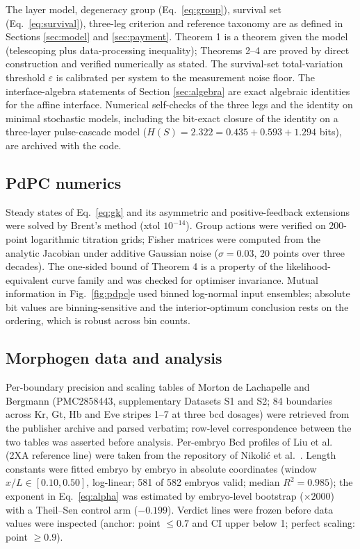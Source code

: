 \documentclass[11pt,a4paper]{article}
\begin{document}
The layer model, degeneracy group (Eq.~\ref{eq:group}), survival set (Eq.~\ref{eq:survival}), three-leg criterion and reference taxonomy are as defined in Sections \ref{sec:model} and \ref{sec:payment}. Theorem 1 is a theorem given the model (telescoping plus data-processing inequality); Theorems 2--4 are proved by direct construction and verified numerically as stated. The survival-set total-variation threshold $\varepsilon$ is calibrated per system to the measurement noise floor. The interface-algebra statements of Section \ref{sec:algebra} are exact algebraic identities for the affine interface. Numerical self-checks of the three legs and the identity on minimal stochastic models, including the bit-exact closure of the identity on a three-layer pulse-cascade model ($H(S)=2.322=0.435+0.593+1.294$ bits), are archived with the code.

\subsection{PdPC numerics}

Steady states of Eq.~\ref{eq:gk} and its asymmetric and positive-feedback extensions were solved by Brent's method (xtol $10^{-14}$). Group actions were verified on 200-point logarithmic titration grids; Fisher matrices were computed from the analytic Jacobian under additive Gaussian noise ($\sigma=0.03$, 20 points over three decades). The one-sided bound of Theorem 4 is a property of the likelihood-equivalent curve family and was checked for optimiser invariance. Mutual information in Fig.~\ref{fig:pdpc}e used binned log-normal input ensembles; absolute bit values are binning-sensitive and the interior-optimum conclusion rests on the ordering, which is robust across bin counts.

\subsection{Morphogen data and analysis}

Per-boundary precision and scaling tables of Morton de Lachapelle and Bergmann \cite{Bergmann2010} (PMC2858443, supplementary Datasets S1 and S2; 84 boundaries across Kr, Gt, Hb and Eve stripes 1--7 at three bcd dosages) were retrieved from the publisher archive and parsed verbatim; row-level correspondence between the two tables was asserted before analysis. Per-embryo Bcd profiles of Liu et al.\ \cite{Liu2013} (2XA reference line) were taken from the repository of Nikoli\'c et al.\ \cite{Nikolic2023}. Length constants were fitted embryo by embryo in absolute coordinates (window $x/L\in[0.10,0.50]$, log-linear; 581 of 582 embryos valid; median $R^2=0.985$); the exponent in Eq.~\ref{eq:alpha} was estimated by embryo-level bootstrap ($\times2000$) with a Theil--Sen control arm ($-0.199$). Verdict lines were frozen before data values were inspected (anchor: point $\le0.7$ and CI upper below 1; perfect scaling: point $\ge0.9$).
\end{document}
